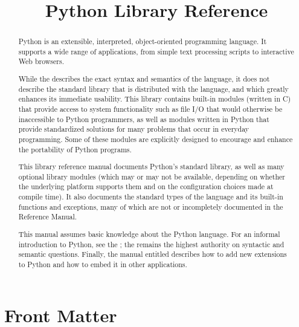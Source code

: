 \documentclass{manual}
\title{Python Library Reference}
\begin{document}
\maketitle

\ifhtml
\chapter*{Front Matter\label{front}}
\fi



\begin{abstract}

\noindent
Python is an extensible, interpreted, object-oriented programming
language.  It supports a wide range of applications, from simple text
processing scripts to interactive Web browsers.

While the 
describes the exact syntax and semantics of the language, it does not
describe the standard library that is distributed with the language,
and which greatly enhances its immediate usability.  This library
contains built-in modules (written in C) that provide access to system
functionality such as file I/O that would otherwise be inaccessible to
Python programmers, as well as modules written in Python that provide
standardized solutions for many problems that occur in everyday
programming.  Some of these modules are explicitly designed to
encourage and enhance the portability of Python programs.

This library reference manual documents Python's standard library, as
well as many optional library modules (which may or may not be
available, depending on whether the underlying platform supports them
and on the configuration choices made at compile time).  It also
documents the standard types of the language and its built-in
functions and exceptions, many of which are not or incompletely
documented in the Reference Manual.

This manual assumes basic knowledge about the Python language.  For an
informal introduction to Python, see the
; the
 remains the
highest authority on syntactic and semantic questions.  Finally, the
manual entitled  describes how to add new extensions to Python
and how to embed it in other applications.

\end{abstract}
\end{document}
